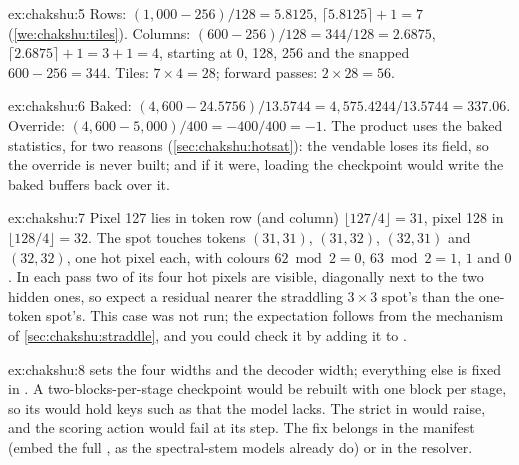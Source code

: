 \begin{solution}{ex:chakshu:5}
Rows: $(1{,}000-256)/128=5.8125$, $\lceil5.8125\rceil+1=7$ (\cref{we:chakshu:tiles}). Columns:
$(600-256)/128=344/128=2.6875$, $\lceil2.6875\rceil+1=3+1=4$, starting at 0, 128, 256 and the snapped $600-256=344$.
Tiles: $7\times4=28$; forward passes: $2\times28=56$.
\end{solution}

\begin{solution}{ex:chakshu:6}
Baked: $(4{,}600-24.5756)/13.5744=4{,}575.4244/13.5744=337.06$. Override: $(4{,}600-5{,}000)/400=-400/400=-1$.
The product uses the baked statistics, for two reasons (\cref{sec:chakshu:hotsat}): the vendable loses its
 field, so the override is never built; and if it were, loading the checkpoint would write the baked
buffers back over it.
\end{solution}

\begin{solution}{ex:chakshu:7}
Pixel 127 lies in token row (and column) $\lfloor127/4\rfloor=31$, pixel 128 in $\lfloor128/4\rfloor=32$. The spot
touches tokens $(31,31)$, $(31,32)$, $(32,31)$ and $(32,32)$, one hot pixel each, with colours $62\bmod2=0$,
$63\bmod2=1$, $1$ and $0$. In each pass two of its four hot pixels are visible, diagonally next to the two hidden
ones, so expect a residual nearer the straddling $3\times3$ spot's than the one-token spot's. This case was not run;
the expectation follows from the mechanism of \cref{sec:chakshu:straddle}, and you could check it by adding it to
.
\end{solution}

\begin{solution}{ex:chakshu:8}
 sets the four widths and  the decoder width; everything else is fixed in
. A two-blocks-per-stage checkpoint would be rebuilt with one block per stage, so its
 would hold keys such as  that the model lacks. The strict
 in  would raise, and the scoring action would fail at
its  step. The fix belongs in the manifest (embed the full , as the
spectral-stem models already do) or in the resolver.
\end{solution}
